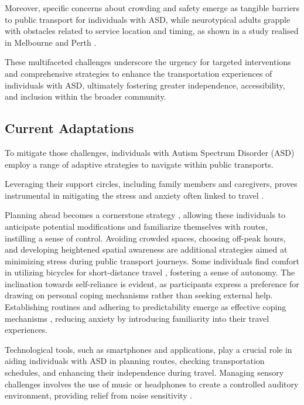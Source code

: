     Moreover, specific concerns about crowding and safety emerge as tangible barriers to public transport for individuals with ASD, while neurotypical adults grapple with obstacles related to service location and timing, as shown in a study realised in Melbourne and Perth \cite{falkmer_viewpoints_2015}. 
    
    These multifaceted challenges underscore the urgency for targeted interventions and comprehensive strategies to enhance the transportation experiences of individuals with ASD, ultimately fostering greater independence, accessibility, and inclusion within the broader community.

\subsection{Current Adaptations}

   To mitigate those challenges, individuals with Autism Spectrum Disorder (ASD) employ a range of adaptive strategies to navigate within public transports. 
   
   Leveraging their support circles, including family members and caregivers, proves instrumental in mitigating the stress and anxiety often linked to travel \cite{deka_co-principal_nodate}. 
   
   Planning ahead becomes a cornerstone strategy \cite{haas_experiences_nodate}, allowing these individuals to anticipate potential modifications and familiarize themselves with routes, instilling a sense of control. Avoiding crowded spaces, choosing off-peak hours, and developing heightened spatial awareness are additional strategies aimed at minimizing stress during public transport journeys.
   Some individuals find comfort in utilizing bicycles for short-distance travel \cite{falkmer_viewpoints_2015}, fostering a sense of autonomy. The inclination towards self-reliance is evident, as participants express a preference for drawing on personal coping mechanisms rather than seeking external help. Establishing routines and adhering to predictability emerge as effective coping mechanisms \cite{falkmer_viewpoints_2015}, reducing anxiety by introducing familiarity into their travel experiences. 
   
   Technological tools, such as smartphones and applications, play a crucial role in aiding individuals with ASD in planning routes, checking transportation schedules, and enhancing their independence during travel. Managing sensory challenges involves the use of music or headphones to create a controlled auditory environment, providing relief from noise sensitivity \cite{haas_experiences_nodate}. 
   
